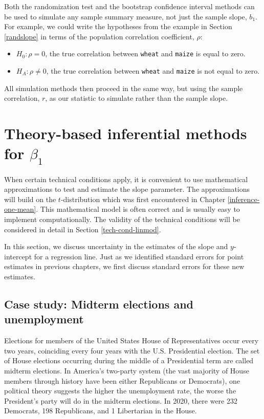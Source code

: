 \documentclass[
  10pt,
  openany]{book}
\providecommand{\tightlist}{%
  \setlength{\itemsep}{0pt}\setlength{\parskip}{0pt}}
\theoremstyle{definition}
\theoremstyle{definition}
\theoremstyle{definition}
\theoremstyle{definition}
\theoremstyle{remark}
\begin{document}
Both the randomization test and the bootstrap confidence interval methods can be used to simulate any sample summary measure, not just the sample slope, \(b_1\). For example, we could write the hypotheses from the example in Section \ref{randslope} in terms of the population correlation coefficient, \(\rho\):

\begin{itemize}
\tightlist
\item
  \(H_0: \rho= 0\), the true correlation between \texttt{wheat} and \texttt{maize} is equal to zero.\\
\item
  \(H_A: \rho \ne 0\), the true correlation between \texttt{wheat} and \texttt{maize} is not equal to zero.
\end{itemize}

All simulation methods then proceed in the same way, but using the sample correlation, \(r\), as our statistic to simulate rather than the sample slope.

\section{\texorpdfstring{Theory-based inferential methods for \(\beta_1\)}{Theory-based inferential methods for \textbackslash beta\_1}}\label{mathslope}

When certain technical conditions apply, it is convenient to use mathematical approximations to test and estimate the slope parameter.
The approximations will build on the \(t\)-distribution which was first encountered in Chapter \ref{inference-one-mean}.
This mathematical model is often correct and is usually easy to implement computationally.
The validity of the technical conditions will be considered in detail in Section \ref{tech-cond-linmod}.

In this section, we discuss uncertainty in the estimates of the slope
and \(y\)-intercept for a regression line. Just as we identified standard
errors for point estimates in previous chapters, we first discuss
standard errors for these new estimates.

\subsection{Case study: Midterm elections and unemployment}\label{case-study-midterm-elections-and-unemployment}


Elections for members of the United States House of Representatives
occur every two years, coinciding every four years with the U.S.
Presidential election. The set of House elections occurring during the
middle of a Presidential term are called midterm elections. In America's two-party
system (the vast majority of House members through history have been either Republicans or Democrats), one political theory suggests the higher the unemployment rate,
the worse the President's party will do in the midterm elections. In 2020, there were 232 Democrats, 198 Republicans, and 1 Libertarian in the House.
\end{document}
